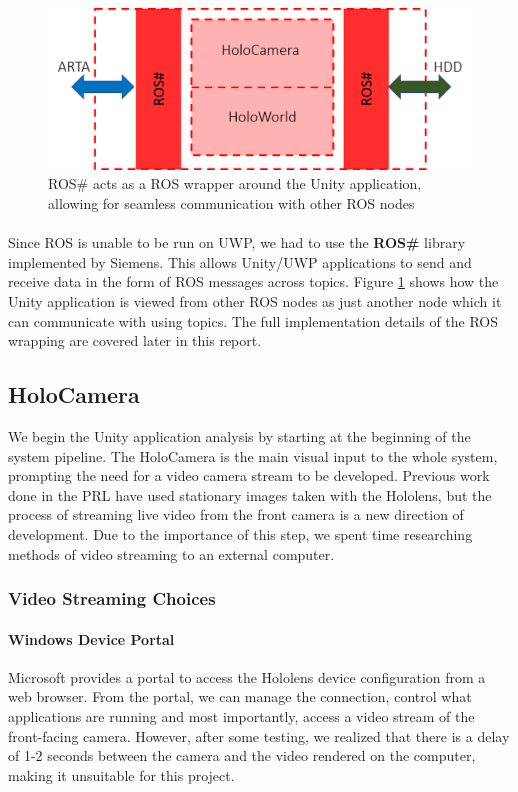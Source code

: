\begin{figure}[ht!]
	\centering
	\includegraphics[width=0.8\linewidth]{img/chapter4_analysis/holoROSSharpWrapper.png}
	\caption{ROS\# acts as a ROS wrapper around the Unity application, allowing for seamless communication with other ROS nodes}
	\label{fig:holoROSWrapper}
	\vspace{-1\baselineskip}
\end{figure}

\paragraph{} Since ROS is unable to be run on UWP, we had to use the \textbf{ROS\#} library implemented by Siemens. This allows Unity/UWP applications to send and receive data in the form of ROS messages across topics. Figure \ref{fig:holoROSWrapper} shows how the Unity application is viewed from other ROS nodes as just another node which it can communicate with using topics. The full implementation details of the ROS wrapping are covered later in this report. 

\subsection{HoloCamera}
We begin the Unity application analysis by starting at the beginning of the system pipeline. The HoloCamera is the main visual input to the whole system, prompting the need for a video camera stream to be developed. Previous work done in the PRL have used stationary images taken with the Hololens, but the process of streaming live video from the front camera is a new direction of development. Due to the importance of this step, we spent time researching methods of video streaming to an external computer.

\subsubsection{Video Streaming Choices} \label{sec:videoStreaming}

\paragraph{Windows Device Portal} Microsoft provides a portal to access the Hololens device configuration from a web browser. From the portal, we can manage the connection, control what applications are running and most importantly, access a video stream of the front-facing camera. However, after some testing, we realized that there is a delay of 1-2 seconds between the camera and the video rendered on the computer, making it unsuitable for this project.

